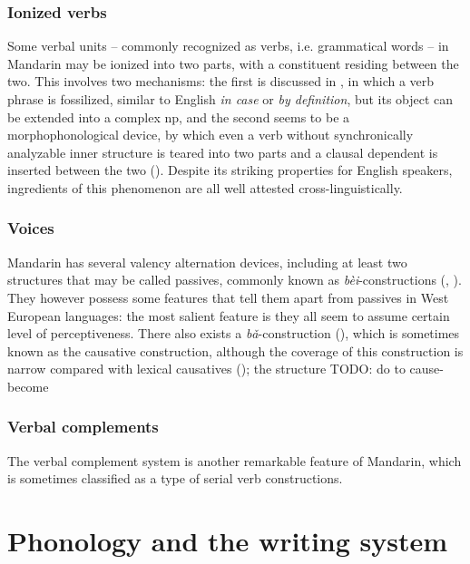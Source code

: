 \documentclass[UTF8, a4paper, oneside, scheme=plain, 12pt]{ctexrep}
\newcommand{\form}[1]{\emph{#1}}
\begin{document}
\subsection{Ionized verbs}

Some verbal units -- commonly recognized as verbs, i.e. grammatical words -- in Mandarin
may be ionized into two parts, 
with a constituent residing between the two. 
This involves two mechanisms:
the first is discussed in , 
in which a verb phrase is fossilized, 
similar to English \form{in case} or \form{by definition},  
but its object can be extended into a complex \acs{np},
and the second seems to be a morphophonological device, 
by which even a verb without synchronically analyzable inner structure 
is teared into two parts and a clausal dependent is inserted between the two 
().
Despite its striking properties for English speakers, 
ingredients of this phenomenon are all well attested cross-linguistically.

\subsection{Voices}

Mandarin has several valency alternation devices, 
including at least two structures 
that may be called passives,
commonly known as \form{bèi}-constructions
(,
).
They however possess some features that tell them apart 
from passives in West European languages:
the most salient feature is 
they all seem to assume certain level of perceptiveness.
There also exists a \form{bǎ}-construction 
(),
which is sometimes known as the causative construction,
although the coverage of this construction 
is narrow compared with lexical causatives ();
the structure TODO: do to cause-become 



\subsection{Verbal complements}

The verbal complement system is another remarkable feature of Mandarin, 
which is sometimes classified as a type of serial verb constructions.


\chapter{Phonology and the writing system}
\end{document}
